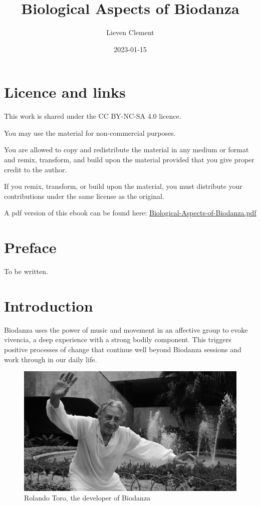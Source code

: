 \documentclass[
  11pt,
]{book}
\title{Biological Aspects of Biodanza}
\author{Lieven Clement}
\date{2023-01-15}
\begin{document}
\maketitle

{
\hypersetup{linkcolor=}
\setcounter{tocdepth}{2}
\tableofcontents
}
\hypertarget{licence-and-links}{%
\chapter*{Licence and links}\label{licence-and-links}}

This work is shared under the CC BY-NC-SA 4.0 licence.

You may use the material for non-commercial purposes.

You are allowed to copy and redistribute the material in any medium or format and remix, transform, and build upon the material provided that you give proper credit to the author.

If you remix, transform, or build upon the material, you must distribute your contributions under the same license as the original.

A pdf version of this ebook can be found here: \href{https://biodanzabrugge.be/biologicalAspectsBiodanza/Biological-Aspects-of-Biodanza.pdf}{Biological-Aspects-of-Biodanza.pdf}

\hypertarget{preface}{%
\chapter*{Preface}\label{preface}}

To be written.

\hypertarget{intro}{%
\chapter{Introduction}\label{intro}}

Biodanza uses the power of music and movement in an affective group to evoke vivencia, a deep experience with a strong bodily component. This triggers positive processes of change that continue well beyond Biodanza sessions and work through in our daily life.

\begin{figure}

{\centering \includegraphics[width=0.45\linewidth]{./figs/rolando} 

}

\caption{Rolando Toro, the developer of Biodanza}\label{fig:rolandoToro}
\end{figure}
\end{document}
